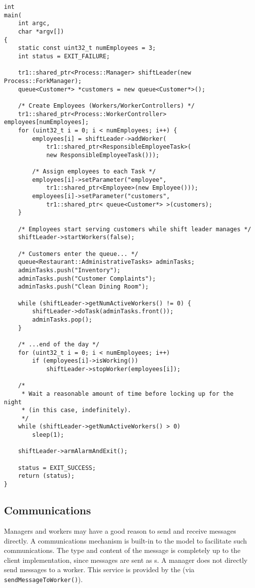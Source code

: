 \begin{lstlisting}[caption={Using \class{Manager}s and \class{WorkerController}s}, label=lst:process_manager-example]
int
main(
    int argc,
    char *argv[])
{
	static const uint32_t numEmployees = 3;
	int status = EXIT_FAILURE;
	
	tr1::shared_ptr<Process::Manager> shiftLeader(new Process::ForkManager);
	queue<Customer*> *customers = new queue<Customer*>();
	
	/* Create Employees (Workers/WorkerControllers) */
	tr1::shared_ptr<Process::WorkerController> employees[numEmployees];
	for (uint32_t i = 0; i < numEmployees; i++) {
		employees[i] = shiftLeader->addWorker(
		    tr1::shared_ptr<ResponsibleEmployeeTask>(
		    new ResponsibleEmployeeTask()));
		
		/* Assign employees to each Task */
		employees[i]->setParameter("employee",
		    tr1::shared_ptr<Employee>(new Employee()));
		employees[i]->setParameter("customers",
		    tr1::shared_ptr< queue<Customer*> >(customers);
	}
	
	/* Employees start serving customers while shift leader manages */
	shiftLeader->startWorkers(false);
	
	/* Customers enter the queue... */
	queue<Restaurant::AdministrativeTasks> adminTasks;
	adminTasks.push("Inventory");
	adminTasks.push("Customer Complaints");
	adminTasks.push("Clean Dining Room");
	
	while (shiftLeader->getNumActiveWorkers() != 0) {
		shiftLeader->doTask(adminTasks.front());
		adminTasks.pop();
	}
	
	/* ...end of the day */
	for (uint32_t i = 0; i < numEmployees; i++)
		if (employees[i]->isWorking())
			shiftLeader->stopWorker(employees[i]);
	
	/* 
	 * Wait a reasonable amount of time before locking up for the night
	 * (in this case, indefinitely).
	 */
	while (shiftLeader->getNumActiveWorkers() > 0)
		sleep(1);
		
	shiftLeader->armAlarmAndExit();
	
	status = EXIT_SUCCESS;	
	return (status);
}

\end{lstlisting}

\subsection{Communications}
\label{subsec:communications}

Managers and workers may have a good reason to send and receive
messages directly.  A communications mechanism is built-in to the
 model to facilitate such communications. 
The type and content of the message is completely up to the client
implementation, since messages are sent as s.
A manager does not directly send messages to a
worker.  This service is provided by the 
(via \texttt{send\-Message\-To\-Worker()}).

